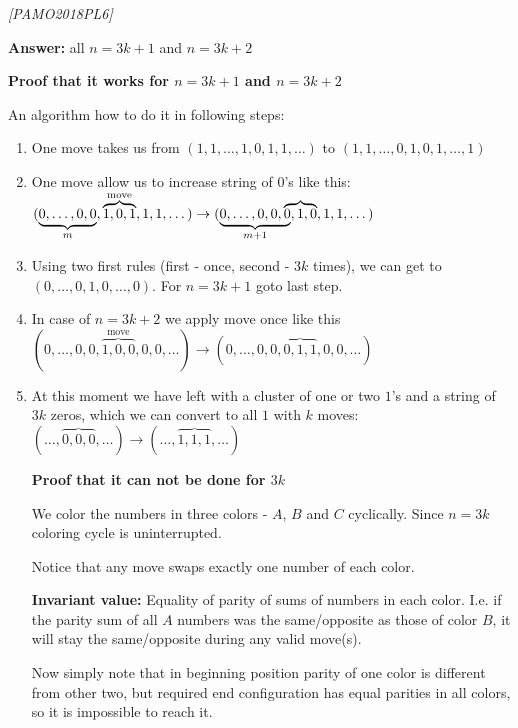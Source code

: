 \begin{problem}
\textit{[PAMO2018PL6]}

\textbf{Answer:} all $n=3k+1$ and $n=3k+2$

\textbf{Proof that it works for $n=3k+1$ and $n=3k+2$}

An algorithm how to do it in following steps:
\begin{enumerate}
\item One move takes us from $(1,1,\dots,1,0,1,1,\dots)$ to $(1,1,\dots,0,1,0,1,\dots,1)$  
\item One move allow us to increase string of $0$'s like this: $(\underbrace{0,\dots,0,0}_m,\overbrace{1,0,1}^\text{move},1,1,\dots)  \rightarrow 
(\lefteqn{\underbrace{\phantom{0,\dots,0,0,0}}_{m+1}}0,\dots,0,0,\overbrace{0,1,0},1,1,\dots) $  
\item Using two first rules (first - once, second - $3k$ times), we can get to $(0,\dots,0,1,0,\dots,0)$. For $n=3k+1$ goto last step.
\item In case of $n=3k+2$ we apply move once like this $(0,\dots,0,0,\overbrace{1,0,0}^\text{move},0,0,\dots)  \rightarrow (0,\dots,0,0,\overbrace{0,1,1},0,0,\dots)$
\item At this moment we have left with a cluster of one or two $1$'s and a string of $3k$ zeros, which we can convert to all $1$ with $k$ moves: $(\dots,\overbrace{0,0,0},\dots) \rightarrow (\dots,\overbrace{1,1,1},\dots)$ 

\textbf{Proof that it can not be done for $3k$}

We color the numbers in three colors - $A$, $B$ and $C$ cyclically. Since $n=3k$ coloring cycle is uninterrupted.

Notice that any move swaps exactly one number of each color. 

\textbf{Invariant value:} Equality of parity of sums of numbers in each color. I.e. if the parity sum of all $A$ numbers was the same/opposite as those of color $B$, it will stay the same/opposite during any valid move(s). 

Now simply note that in beginning position parity of one color is different from other two, but required end configuration has equal parities in all colors, so it is impossible to reach it.
 
\end{enumerate}
\end{problem}
%



